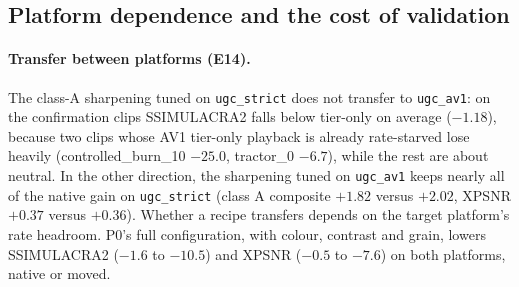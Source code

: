 \begin{table}[t]
  \centering
  \small
  \caption{E11: fixed recipes versus tier-only (near-lossless upload), all tested clips per class
  (mean [95\,\% CI]).}
  \label{tab:e11}
  \setlength{\tabcolsep}{3pt}
\end{table}

\subsection{Platform dependence and the cost of validation}
\label{sec:results-platform}

\paragraph{Transfer between platforms (E14).}
The class-A sharpening tuned on \texttt{ugc\_strict} does not transfer to \texttt{ugc\_av1}: on the
confirmation clips SSIMULACRA2 falls below tier-only on average ($-1.18$), because two clips whose AV1
tier-only playback is already rate-starved lose heavily (controlled\_burn\_10 $-25.0$, tractor\_0
$-6.7$), while the rest are about neutral. In the other direction, the sharpening tuned on
\texttt{ugc\_av1} keeps nearly all of the native gain on \texttt{ugc\_strict} (class A composite
$+1.82$ versus $+2.02$, XPSNR $+0.37$ versus $+0.36$). Whether a recipe transfers depends on the
target platform's rate headroom. P0's full configuration, with colour, contrast and grain, lowers
SSIMULACRA2 ($-1.6$ to $-10.5$) and XPSNR ($-0.5$ to $-7.6$) on both platforms, native or moved.

